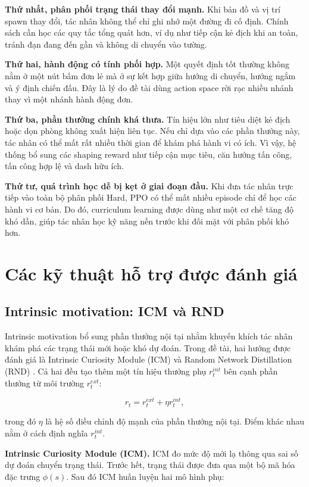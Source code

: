 \textbf{Thứ nhất, phân phối trạng thái thay đổi mạnh.} Khi bản đồ và vị trí spawn thay đổi, tác nhân không thể chỉ ghi nhớ một đường đi cố định. Chính sách cần học các quy tắc tổng quát hơn, ví dụ như tiếp cận kẻ địch khi an toàn, tránh đạn đang đến gần và không di chuyển vào tường.

\textbf{Thứ hai, hành động có tính phối hợp.} Một quyết định tốt thường không nằm ở một nút bấm đơn lẻ mà ở sự kết hợp giữa hướng di chuyển, hướng ngắm và ý định chiến đấu. Đây là lý do đề tài dùng action space rời rạc nhiều nhánh thay vì một nhánh hành động đơn.

\textbf{Thứ ba, phần thưởng chính khá thưa.} Tín hiệu lớn như tiêu diệt kẻ địch hoặc dọn phòng không xuất hiện liên tục. Nếu chỉ dựa vào các phần thưởng này, tác nhân có thể mất rất nhiều thời gian để khám phá hành vi có ích. Vì vậy, hệ thống bổ sung các shaping reward như tiếp cận mục tiêu, căn hướng tấn công, tấn công hợp lệ và dash hữu ích.

\textbf{Thứ tư, quá trình học dễ bị kẹt ở giai đoạn đầu.} Khi đưa tác nhân trực tiếp vào toàn bộ phân phối Hard, PPO có thể mất nhiều episode chỉ để học các hành vi cơ bản. Do đó, curriculum learning được dùng như một cơ chế tăng độ khó dần, giúp tác nhân học kỹ năng nền trước khi đối mặt với phân phối khó hơn.

\section{Các kỹ thuật hỗ trợ được đánh giá}
\subsection{Intrinsic motivation: ICM và RND}

Intrinsic motivation bổ sung phần thưởng nội tại nhằm khuyến khích tác nhân khám phá các trạng thái mới hoặc khó dự đoán. Trong đề tài, hai hướng được đánh giá là Intrinsic Curiosity Module (ICM) \cite{Pathak2017} và Random Network Distillation (RND) \cite{Burda2018}. Cả hai đều tạo thêm một tín hiệu thưởng phụ $r_t^{int}$ bên cạnh phần thưởng từ môi trường $r_t^{ext}$:

\begin{equation}
    r_t = r_t^{ext} + \eta r_t^{int},
\end{equation}

trong đó $\eta$ là hệ số điều chỉnh độ mạnh của phần thưởng nội tại. Điểm khác nhau nằm ở cách định nghĩa $r_t^{int}$.

\textbf{Intrinsic Curiosity Module (ICM).}
ICM đo mức độ mới lạ thông qua sai số dự đoán chuyển trạng thái. Trước hết, trạng thái được đưa qua một bộ mã hóa đặc trưng $\phi(s)$. Sau đó ICM huấn luyện hai mô hình phụ:

